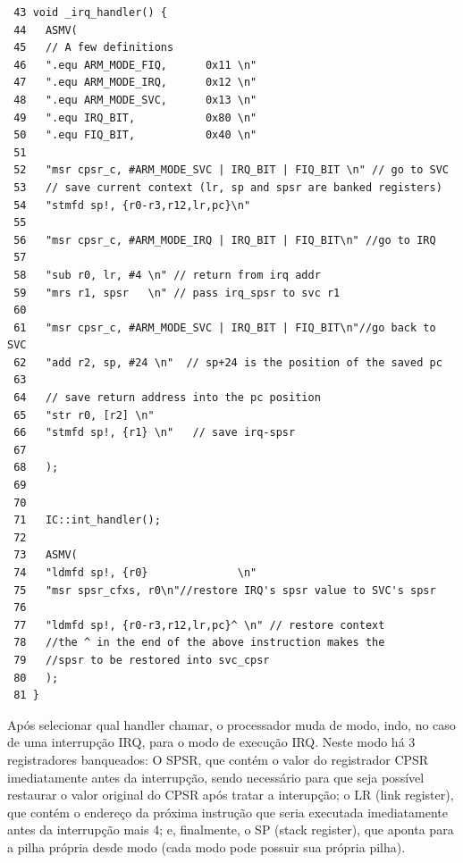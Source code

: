 \documentclass{ufscThesis/ufscThesis} %
\begin{document}
\begin{verbatim}
 43 void _irq_handler() {
 44   ASMV(
 45   // A few definitions
 46   ".equ ARM_MODE_FIQ,      0x11 \n"
 47   ".equ ARM_MODE_IRQ,      0x12 \n"
 48   ".equ ARM_MODE_SVC,      0x13 \n"
 49   ".equ IRQ_BIT,           0x80 \n"
 50   ".equ FIQ_BIT,           0x40 \n"
 51 
 52   "msr cpsr_c, #ARM_MODE_SVC | IRQ_BIT | FIQ_BIT \n" // go to SVC
 53   // save current context (lr, sp and spsr are banked registers)
 54   "stmfd sp!, {r0-r3,r12,lr,pc}\n"
 55 
 56   "msr cpsr_c, #ARM_MODE_IRQ | IRQ_BIT | FIQ_BIT\n" //go to IRQ
 57 
 58   "sub r0, lr, #4 \n" // return from irq addr
 59   "mrs r1, spsr   \n" // pass irq_spsr to svc r1
 60 
 61   "msr cpsr_c, #ARM_MODE_SVC | IRQ_BIT | FIQ_BIT\n"//go back to SVC
 62   "add r2, sp, #24 \n"  // sp+24 is the position of the saved pc
 63   
 64   // save return address into the pc position
 65   "str r0, [r2] \n" 
 66   "stmfd sp!, {r1} \n"   // save irq-spsr
 67       
 68   );    
 69   
 70     
 71   IC::int_handler();
 72     
 73   ASMV(        
 74   "ldmfd sp!, {r0}              \n"
 75   "msr spsr_cfxs, r0\n"//restore IRQ's spsr value to SVC's spsr
 76             
 77   "ldmfd sp!, {r0-r3,r12,lr,pc}^ \n" // restore context
 78   //the ^ in the end of the above instruction makes the 
 79   //spsr to be restored into svc_cpsr
 80   );
 81 }
\end{verbatim}

Após selecionar qual handler chamar, o processador muda de modo, indo, no caso de uma interrupção IRQ, para o modo de execução IRQ. Neste modo há 3 registradores banqueados: O SPSR, que contém o valor do registrador CPSR imediatamente antes da interrupção, sendo necessário para que seja possível restaurar o valor original do CPSR após tratar a interupção; o LR (link register), que contém o endereço da próxima instrução que seria executada imediatamente antes da interrupção mais 4; e, finalmente, o SP (stack register), que aponta para a pilha própria desde modo (cada modo pode possuir sua própria pilha).
\end{document}
